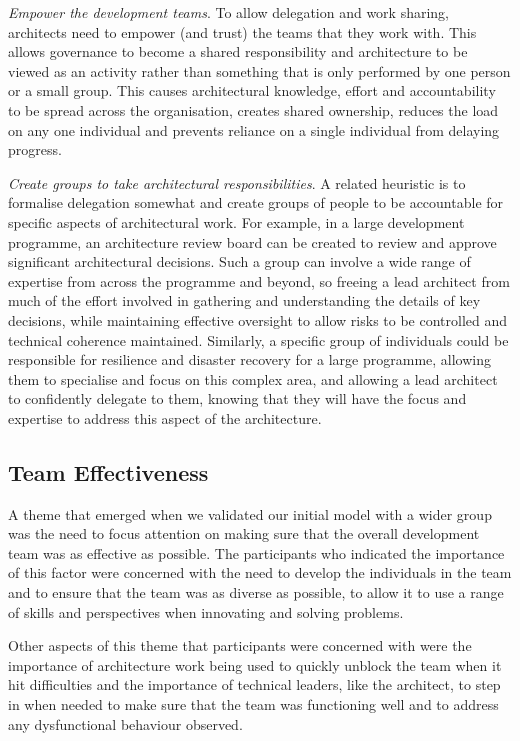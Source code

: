 \begin{description}
	\item \emph{Empower the development teams}. To allow delegation and work sharing, architects need to empower (and trust) the teams that they work with.  This allows governance to become a shared responsibility and architecture to be viewed as an activity rather than something that is only performed by one person or a small group.  This causes architectural knowledge, effort and accountability to be spread across the organisation, creates shared ownership, reduces the load on any one individual and prevents reliance on a single individual from delaying progress.
	\item \emph{Create groups to take architectural responsibilities}.  A related heuristic is to formalise delegation somewhat and create groups of people to be accountable for specific aspects of architectural work.  For example, in a large development programme, an architecture review board can be created to review and approve significant architectural decisions.  Such a group can involve a wide range of expertise from across the programme and beyond, so freeing a lead architect from much of the effort involved in gathering and understanding the details of key decisions, while maintaining effective oversight to allow risks to be controlled and technical coherence maintained.  Similarly, a specific group of individuals could be responsible for resilience and disaster recovery for a large programme, allowing them to specialise and focus on this complex area, and allowing a lead architect to confidently delegate to them, knowing that they will have the focus and expertise to address this aspect of the architecture.
\end{description}

\subsection{Team Effectiveness}

A theme that emerged when we validated our initial model with a wider group was the need to focus attention on making sure that the overall development team was as effective as possible.  The participants who indicated the importance of this factor were concerned with the need to develop the individuals in the team and to ensure that the team was as diverse as possible, to allow it to use a range of skills and perspectives when innovating and solving problems.

Other aspects of this theme that participants were concerned with were the importance of architecture work being used to quickly unblock the team when it hit difficulties and the importance of technical leaders, like the architect, to step in when needed to make sure that the team was functioning well and to address any dysfunctional behaviour observed.

